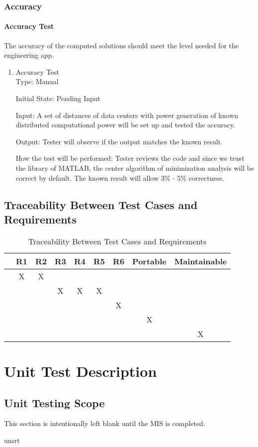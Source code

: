 \documentclass[12pt, titlepage]{article}
\begin{document}
\subsubsection{Accuracy}\label{Audst}

\paragraph{Accuracy Test}   The accuracy of the computed solutions should meet the level needed for the engineering app.

\begin{enumerate}
\item{Accuracy Test}\\

Type: Manual
					
Initial State: Pending Input
					
Input: A set of distances of data centers with power generation of known distributed computational power will be set up and tested the accuracy.
					
Output: Tester will observe if the output matches the known result.
					
How the test will be performed: Tester reviews the code and since we trust the library of MATLAB, the center algorithm of minimization analysis will be correct by default. The known result will allow 3\% - 5\% correctness.\textsuperscript{\cite{rivier2013electricity}}

\end{enumerate}



\subsection{Traceability Between Test Cases and Requirements}

\begin{table}[h!]
	\centering
	\begin{tabular}{|c|c|c|c|c|c|c|c|c|}
		\hline
		& R1 & R2 & R3 & R4 & R5 & R6 & Portable & Maintainable \\
		\hline
		\nameref{Ainput}    &X&X& & & & & & \\ \hline
		\nameref{Aoutput}   & & &X&X&X& & & \\ \hline
		\nameref{Aport}     & & & & & &X& & \\ \hline
		\nameref{Amaintain} & & & & & & &X& \\ \hline
		\nameref{Audst}     & & & & & & & &X\\ \hline
	\end{tabular}
	\caption{Traceability Between Test Cases and Requirements}
	\label{Table:A_trace}
\end{table}
\newpage
\section{Unit Test Description}
\label{unittest}

\subsection{Unit Testing Scope}

This section is intentionally left blank until the MIS is completed.

\newpage

 {unsrt}

\end{document}

